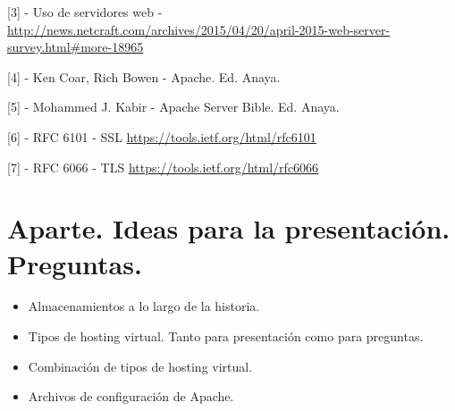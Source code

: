 \documentclass[a4paper, 10pt]{article} %
\begin{document}
[3] - Uso de servidores web - \url{http://news.netcraft.com/archives/2015/04/20/april-2015-web-server-survey.html\#more-18965}

[4] - Ken Coar, Rich Bowen - Apache. Ed. Anaya. 

[5] - Mohammed J. Kabir - Apache Server Bible. Ed. Anaya. 

[6] - RFC 6101 - SSL \url{https://tools.ietf.org/html/rfc6101}

[7] - RFC 6066 - TLS \url{https://tools.ietf.org/html/rfc6066}

\section{Aparte. Ideas para la presentación. Preguntas.}
\begin{itemize}
\item Almacenamientos a lo largo de la historia. 
\item Tipos de hosting virtual. Tanto para presentación como para preguntas. 
\item Combinación de tipos de hosting virtual. 
\item Archivos de configuración de Apache.
\end{itemize}
\end{document}

